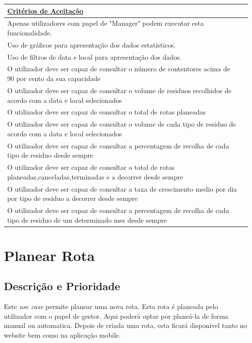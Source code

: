 \documentclass{scrreprt}
\begin{document}
		\begin{tabular}{|p{5.8in}|p{0.7in}|} \hline 
		\underline{Critérios de Aceitação} \\ \hline 
		Apenas utilizadores com papel de "Manager" podem executar esta funcionalidade. \\ \hline 
		Uso de gráficos para apresentação dos dados estatisticos.\\ \hline	
		Uso de filtros de data e local para apresentação dos dados.\\ \hline
		O utilizador deve ser capaz de consultar o número de contentores acima de 90 por cento da sua capacidade\\ \hline
		O utilizador deve ser capaz de consultar o volume de residuos recolhidos de acordo com a data e local selecionados\\ \hline
		O utilizador deve ser capaz de consultar o total de rotas planeadas\\ \hline
		O utilizador deve ser capaz de consultar o volume de cada tipo de residuo de acordo com a data e local selecionados\\ \hline
		O utilizador deve ser capaz de consultar a percentagem de recolha de cada tipo de residuo desde sempre \\ \hline
		O utilizador deve ser capaz de consultar o total de rotas planeadas,canceladas,terminadas e a decorrer desde sempre\\ \hline
		O utilizador deve ser capaz de consultar a taxa de crescimento medio por dia por tipo de residuo a decorrer desde sempre\\ \hline
		O utilizador deve ser capaz de consultar a percentagem de recolha de cada tipo de residuo de um determinado mes desde sempre\\ \hline	
	\end{tabular}\newline\newline
	
	\section{Planear Rota}
	
	\subsection{Descrição e Prioridade}
	
	Este \textit{use case} permite planear uma nova rota. Esta rota é planeada pelo utilizador com o papel de gestor. Aqui poderá optar por planeá-la de forma manual ou automatica. Depois de criada uma rota, esta ficará disponivel tanto no website bem como na aplicação mobile.
	
\end{document}
